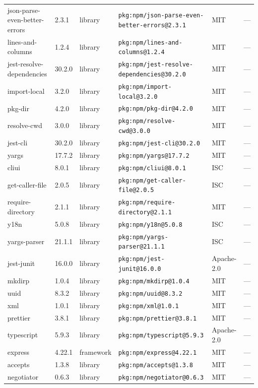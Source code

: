 \documentclass[11pt]{article}
\begin{document}
\begin{longtable}{|l|l|l|p{2.2cm}|l|p{4cm}|}
json-parse-even-better-errors & 2.3.1 & library & \texttt{pkg:npm/json-parse-even-better-errors@2.3.1} & MIT & — \\
lines-and-columns & 1.2.4 & library & \texttt{pkg:npm/lines-and-columns@1.2.4} & MIT & — \\
jest-resolve-dependencies & 30.2.0 & library & \texttt{pkg:npm/jest-resolve-dependencies@30.2.0} & MIT & — \\
import-local & 3.2.0 & library & \texttt{pkg:npm/import-local@3.2.0} & MIT & — \\
pkg-dir & 4.2.0 & library & \texttt{pkg:npm/pkg-dir@4.2.0} & MIT & — \\
resolve-cwd & 3.0.0 & library & \texttt{pkg:npm/resolve-cwd@3.0.0} & MIT & — \\
jest-cli & 30.2.0 & library & \texttt{pkg:npm/jest-cli@30.2.0} & MIT & — \\
yargs & 17.7.2 & library & \texttt{pkg:npm/yargs@17.7.2} & MIT & — \\
cliui & 8.0.1 & library & \texttt{pkg:npm/cliui@8.0.1} & ISC & — \\
get-caller-file & 2.0.5 & library & \texttt{pkg:npm/get-caller-file@2.0.5} & ISC & — \\
require-directory & 2.1.1 & library & \texttt{pkg:npm/require-directory@2.1.1} & MIT & — \\
y18n & 5.0.8 & library & \texttt{pkg:npm/y18n@5.0.8} & ISC & — \\
yargs-parser & 21.1.1 & library & \texttt{pkg:npm/yargs-parser@21.1.1} & ISC & — \\
jest-junit & 16.0.0 & library & \texttt{pkg:npm/jest-junit@16.0.0} & Apache-2.0 & — \\
mkdirp & 1.0.4 & library & \texttt{pkg:npm/mkdirp@1.0.4} & MIT & — \\
uuid & 8.3.2 & library & \texttt{pkg:npm/uuid@8.3.2} & MIT & — \\
xml & 1.0.1 & library & \texttt{pkg:npm/xml@1.0.1} & MIT & — \\
prettier & 3.8.1 & library & \texttt{pkg:npm/prettier@3.8.1} & MIT & — \\
typescript & 5.9.3 & library & \texttt{pkg:npm/typescript@5.9.3} & Apache-2.0 & — \\
express & 4.22.1 & framework & \texttt{pkg:npm/express@4.22.1} & MIT & — \\
accepts & 1.3.8 & library & \texttt{pkg:npm/accepts@1.3.8} & MIT & — \\
negotiator & 0.6.3 & library & \texttt{pkg:npm/negotiator@0.6.3} & MIT & — \\

\end{longtable}
\end{document}
